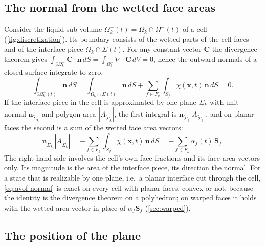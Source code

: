 \documentclass[preprint,12pt]{elsarticle}
\newcommand{\x}{\mathbf{x}}
\newcommand{\n}{\mathbf{n}}
\newcommand{\Sf}{\mathbf{S}_f}
\newcommand{\nSk}{\mathbf{n}_{\tilde{\Sigma}_k}}
\newcommand{\ASk}{A_{\tilde{\Sigma}_k}}
\begin{document}


\subsection{The normal from the wetted face areas}

Consider the liquid sub-volume $\Omega_k^-(t) = \Omega_k \cap \Omega^-(t)$ of a cell (\cref{fig:discretization}). Its boundary consists of the wetted parts of the cell faces and of the interface piece $\Omega_k \cap \Sigma(t)$. For any constant vector $\mathbf{C}$ the divergence theorem gives $\int_{\partial\Omega_k^-}\mathbf{C}\cdot\n\,dS = \int_{\Omega_k^-}\nabla\cdot\mathbf{C}\,dV = 0$, hence the outward normals of a closed surface integrate to zero,
\begin{equation}
\int_{\partial\Omega_k^-(t)}\n\,dS = \int_{\Omega_k \cap \Sigma(t)}\n\,dS + \sum_{f \in F_k}\int_{S_f}\chi(\x,t)\,\n\,dS = 0.
\label{eq:closed}
\end{equation}
If the interface piece in the cell is approximated by one plane $\tilde{\Sigma}_k$ with unit normal $\nSk$ and polygon area $|\ASk|$, the first integral is $\nSk|\ASk|$, and on planar faces the second is a sum of the wetted face area vectors:
\begin{equation}
\nSk\,|\ASk| = -\sum_{f \in F_k}\int_{S_f}\chi(\x,t)\,\n\,dS = -\sum_{f \in F_k}\alpha_f(t)\,\Sf.
\label{eq:avof-normal}
\end{equation}
The right-hand side involves the cell's own face fractions and its face area vectors only. Its magnitude is the area of the interface piece, its direction the normal. For a state that is realizable by one plane, i.e.\ a planar interface cut through the cell, \cref{eq:avof-normal} is exact on every cell with planar faces, convex or not, because the identity is the divergence theorem on a polyhedron; on warped faces it holds with the wetted area vector in place of $\alpha_f\Sf$ (\cref{sec:warped}).

\subsection{The position of the plane}
\end{document}
